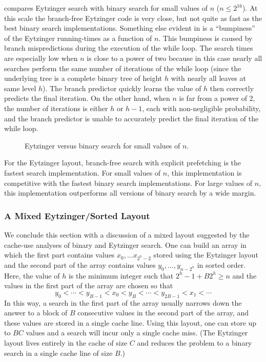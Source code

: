 \documentclass{patmorin}
\begin{document}
 compares Eytzinger search with binary search for
small values of $n$ ($n\le 2^{16}$).  At this scale
the branch-free Eytzinger code is very close, but not quite as fast
as the best binary search implementations.  Something else evident in
 is a ``bumpiness'' of the Eytzinger running-times
as a function of $n$.  This bumpiness is caused by branch mispredictions
during the execution of the while loop.  The search times are especially
low when $n$ is close to a power of two because in this case nearly all
searches perform the same number of iterations of the while loop (since
the underlying tree is a complete binary tree of height $h$ with nearly
all leaves at same level $h$).  The branch predictor quickly learns
the value of $h$ then correctly predicts the final iteration.  On the
other hand, when $n$ is far from a power of 2, the number of iterations
is either $h$ or $h-1$, each with non-negligible probability, and the
branch predictor is unable to accurately predict the final iteration of
the while loop.

\begin{figure}
   \caption{Eytzinger versus binary search for small values of $n$.}
\end{figure}



\begin{lesson}
  For the Eytzinger layout, branch-free search with explicit prefetching
  is the fastest search implementation. For small values of $n$,
  this implementation is competitive with the fastest binary search
  implementations. For large values of $n$, this implementation
  outperforms all versions of binary search by a wide margin.
\end{lesson}

\subsubsection{A Mixed Eytzinger/Sorted Layout}

We conclude this section with a discussion of a mixed layout suggested by
the cache-use analyses of binary and Eytzinger search. One can build an
array in which the first part contains values $x_0,\ldots x_{2^{h}-2}$ stored
using the Eytzinger layout and the second
part of the array contains values $y_0,\ldots,y_{n-2^h}$ in sorted order.
Here, the value of $h$ is the minimum integer such that $2^{h}-1 + B2^h
\ge n$ and the values in the first part of the array are chosen so that
\[
    y_0<\cdots<y_{B-1} < x_0 < y_{B}<\cdots<y_{2B-1} < x_1 < \cdots
\]
In this way, a search in the first part of the array usually narrows
down the answer to a block of $B$ consecutive values in the second part
of the array, and these values are stored in a single cache line. Using
this layout, one can store up to $BC$ values and a search will incur
only a single cache miss. (The Eytzinger layout lives entirely in the
cache of size $C$ and reduces the problem to a binary search in a single
cache line of size $B$.)
\end{document}
